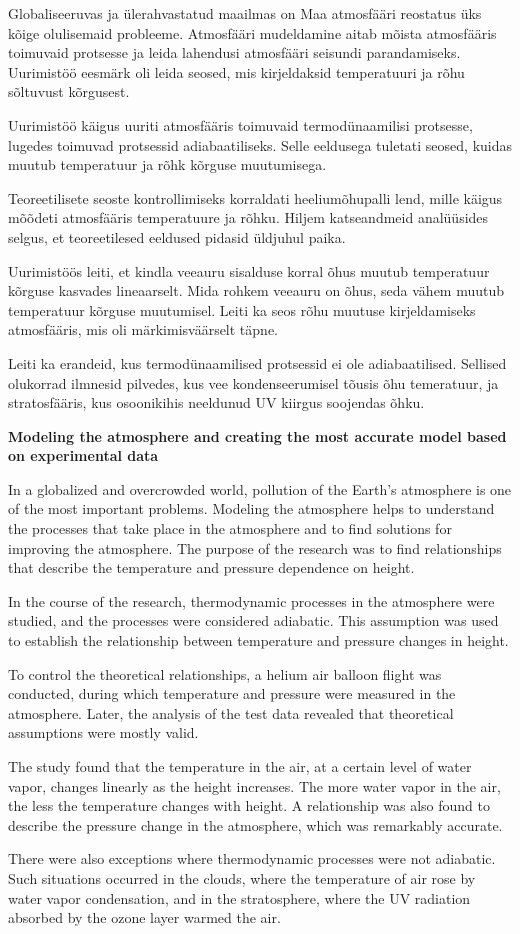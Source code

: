 \documentclass{trkut}%
\begin{document}
Globaliseeruvas ja ülerahvastatud maailmas on Maa atmosfääri reostatus üks kõige olulisemaid probleeme. Atmosfääri mudeldamine aitab mõista atmosfääris toimuvaid protsesse ja leida lahendusi atmosfääri seisundi parandamiseks. Uurimistöö eesmärk oli leida seosed, mis kirjeldaksid temperatuuri ja rõhu sõltuvust kõrgusest.

Uurimistöö käigus uuriti atmosfääris toimuvaid termodünaamilisi protsesse, lugedes toimuvad protsessid adiabaatiliseks. Selle eeldusega tuletati seosed, kuidas muutub temperatuur ja rõhk kõrguse muutumisega.

Teoreetilisete seoste kontrollimiseks korraldati heeliumõhupalli lend, mille käigus mõõdeti atmosfääris temperatuure ja rõhku. Hiljem katseandmeid analüüsides selgus, et teoreetilesed eeldused pidasid üldjuhul paika.

Uurimistöös leiti, et kindla veeauru sisalduse korral õhus muutub temperatuur kõrguse kasvades lineaarselt. Mida rohkem veeauru on õhus, seda vähem muutub temperatuur kõrguse muutumisel. Leiti ka seos rõhu muutuse kirjeldamiseks atmosfääris, mis oli märkimisväärselt täpne.

Leiti ka erandeid, kus termodünaamilised protsessid ei ole adiabaatilised. Sellised olukorrad ilmnesid pilvedes, kus vee kondenseerumisel tõusis õhu temeratuur, ja stratosfääris, kus osoonikihis neeldunud UV kiirgus soojendas õhku.



\textbf{\large Modeling the atmosphere and creating the most accurate model based on experimental data}

In a globalized and overcrowded world, pollution of the Earth's atmosphere is one of the most important problems. Modeling the atmosphere helps to understand the processes that take place in the atmosphere and to find solutions for improving the atmosphere. The purpose of the research was to find relationships that describe the temperature and pressure dependence on height.

In the course of the research, thermodynamic processes in the atmosphere were studied, and the processes were considered adiabatic. This assumption was used to establish the relationship between temperature and pressure changes in height.

To control the theoretical relationships, a helium air balloon flight was conducted, during which temperature and pressure were measured in the atmosphere. Later, the analysis of the test data revealed that theoretical assumptions were mostly valid.

The study found that the temperature in the air, at a certain level of water vapor, changes linearly as the height increases. The more water vapor in the air, the less the temperature changes with height. A relationship was also found to describe the pressure change in the atmosphere, which was remarkably accurate.

There were also exceptions where thermodynamic processes were not adiabatic. Such situations occurred in the clouds, where the temperature of air rose by water vapor condensation, and in the stratosphere, where the UV radiation absorbed by the ozone layer warmed the air.
\end{document}
